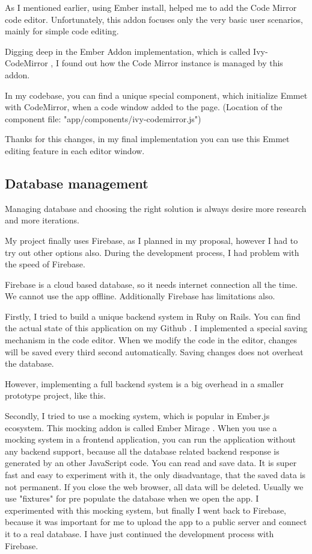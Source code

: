 \documentclass[12pt, a4paper, oneside, openright, medskipamount]{report}
\begin{document}
As I mentioned earlier, using Ember install, helped me to add the Code Mirror code editor. Unfortunately, this addon focuses only the very basic user scenarios, mainly for simple code editing.

Digging deep in the Ember Addon implementation, which is called Ivy-CodeMirror \cite{ivy-codemirror}, I found out how the Code Mirror instance is managed by this addon.

In my codebase, you can find a unique special component, which initialize Emmet with CodeMirror, when a code window added to the page. (Location of the component file: "app/components/ivy-codemirror.js")

Thanks for this changes, in my final implementation you can use this Emmet editing feature in each editor window.

\subsection{Database management}

Managing database and choosing the right solution is always desire more research and more iterations.

My project finally uses Firebase, as I planned in my proposal, however I had to try out other options also. During the development process, I had problem with the speed of Firebase.

Firebase is a cloud based database, so it needs internet connection all the time. We cannot use the app offline. Additionally Firebase has limitations also.

Firstly, I tried to build a unique backend system in Ruby on Rails. You can find the actual state of this application on my Github \cite{tutorial-builder-backend}. I implemented a special saving mechanism in the code editor. When we modify the code in the editor, changes will be saved every third second automatically. Saving changes does not overheat the database.

However, implementing a full backend system is a big overhead in a smaller prototype project, like this.

Secondly, I tried to use a mocking system, which is popular in Ember.js ecosystem. This mocking addon is called Ember Mirage \cite{ember-mirage}. When you use a mocking system in a frontend application, you can run the application without any backend support, because all the database related backend response is generated by an other JavaScript code. You can read and save data. It is super fast and easy to experiment with it, the only disadvantage, that the saved data is not permanent. If you close the web browser, all data will be deleted. Usually we use "fixtures" for pre populate the database when we open the app. I experimented with this mocking system, but finally I went back to Firebase, because it was important for me to upload the app to a public server and connect it to a real database. I have just continued the development process with Firebase.
\end{document}
